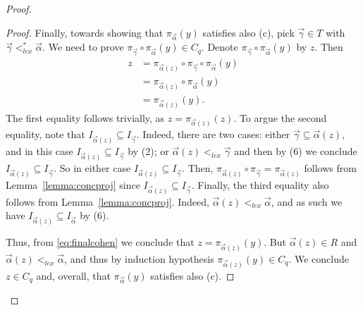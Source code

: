 \documentclass[10pt,a4paper]{amsart}
\begin{document}
\begin{proof}
\begin{proof}
Finally, towards showing that $\pi_{\vec{\alpha}}(y)$ satisfies also (c), pick $\vec{\gamma} \in T$ with $\vec{\gamma} <^*_{lex} \vec{\alpha}$. We need to prove $\pi_{\vec{\gamma}} \circ \pi_{\vec{\alpha}}(y) \in C_q$. Denote $\pi_{\vec{\gamma}} \circ \pi_{\vec{\alpha}}(y) $ by $z$. Then
\begin{equation}\label{eq:finalcohen}
\begin{split}
z &= \pi_{\vec{\alpha}(z)} \circ \pi_{\vec{\gamma}} \circ \pi_{\vec{\alpha}} (y)\\
&= \pi_{\vec{\alpha}(z)} \circ \pi_{\vec{\alpha}} (y)\\
&= \pi_{\vec{\alpha}(z)}(y).
\end{split}
\end{equation}
The first equality follows trivially, as $z = \pi_{\vec{\alpha}(z)} (z)$. To argue the second equality, note that $I_{\vec{\alpha}(z)} \subseteq I_{\vec{\gamma}}$. Indeed, there are two cases: either $\vec{\gamma} \subseteq \vec{\alpha}(z)$, and in this case $I_{\vec{\alpha}(z)} \subseteq I_{\vec{\gamma}}$ by (2); or $\vec{\alpha}(z) <_{lex} \vec{\gamma}$ and then by (6) we conclude $I_{\vec{\alpha}(z)} \subseteq I_{\vec{\gamma}}$. So in either case $I_{\vec{\alpha}(z)} \subseteq I_{\vec{\gamma}}$. Then, $\pi_{\vec{\alpha}(z)} \circ \pi_{\vec{\gamma}} = \pi_{\vec{\alpha}(z)}$ follows from Lemma~\ref{lemma:concproj} since $I_{\vec{\alpha}(z)} \subseteq I_{\vec{\gamma}}$. Finally, the third equality also follows from Lemma~\ref{lemma:concproj}. Indeed, $\vec{\alpha}(z)  <_{lex} \vec{\alpha}$, and as such we have $I_{\vec{\alpha}(z)} \subseteq I_{\vec{\alpha}}$ by (6).  

Thus, from \eqref{eq:finalcohen} we conclude that $z = \pi_{\vec{\alpha}(z)} (y)$. But $\vec{\alpha}(z) \in R$ and $\vec{\alpha}(z) <_{lex} \vec{\alpha}$, and thus by induction hypothesis $\pi_{\vec{\alpha}(z)} (y) \in C_q$. We conclude $z \in C_q$ and, overall, that $\pi_{\vec{\alpha}}(y)$ satisfies also (c).
\end{proof}
\end{proof}
\end{document}
